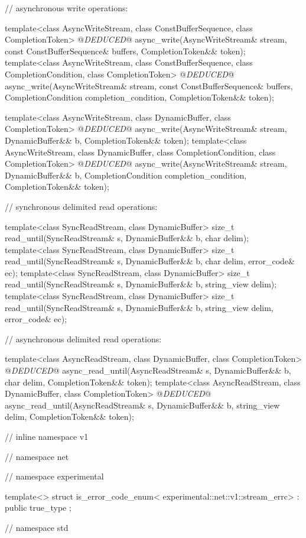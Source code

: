 \begin{codeblock}
{{{{  // asynchronous write operations:

  template<class AsyncWriteStream, class ConstBufferSequence,
    class CompletionToken>
      @\textit{DEDUCED}@ async_write(AsyncWriteStream& stream,
                       const ConstBufferSequence& buffers,
                       CompletionToken&& token);
  template<class AsyncWriteStream, class ConstBufferSequence,
    class CompletionCondition, class CompletionToken>
      @\textit{DEDUCED}@ async_write(AsyncWriteStream& stream,
                       const ConstBufferSequence& buffers,
                       CompletionCondition completion_condition,
                       CompletionToken&& token);

  template<class AsyncWriteStream, class DynamicBuffer, class CompletionToken>
    @\textit{DEDUCED}@ async_write(AsyncWriteStream& stream,
                     DynamicBuffer&& b, CompletionToken&& token);
  template<class AsyncWriteStream, class DynamicBuffer,
    class CompletionCondition, class CompletionToken>
      @\textit{DEDUCED}@ async_write(AsyncWriteStream& stream,
                       DynamicBuffer&& b,
                       CompletionCondition completion_condition,
                       CompletionToken&& token);

  // synchronous delimited read operations:

  template<class SyncReadStream, class DynamicBuffer>
    size_t read_until(SyncReadStream& s, DynamicBuffer&& b, char delim);
  template<class SyncReadStream, class DynamicBuffer>
    size_t read_until(SyncReadStream& s, DynamicBuffer&& b,
                      char delim, error_code& ec);
  template<class SyncReadStream, class DynamicBuffer>
    size_t read_until(SyncReadStream& s, DynamicBuffer&& b, string_view delim);
  template<class SyncReadStream, class DynamicBuffer>
    size_t read_until(SyncReadStream& s, DynamicBuffer&& b,
                      string_view delim, error_code& ec);

  // asynchronous delimited read operations:

  template<class AsyncReadStream, class DynamicBuffer, class CompletionToken>
    @\textit{DEDUCED}@ async_read_until(AsyncReadStream& s,
                          DynamicBuffer&& b, char delim,
                          CompletionToken&& token);
  template<class AsyncReadStream, class DynamicBuffer, class CompletionToken>
    @\textit{DEDUCED}@ async_read_until(AsyncReadStream& s,
                          DynamicBuffer&& b, string_view delim,
                          CompletionToken&& token);

} // inline namespace v1
} // namespace net
} // namespace experimental

  template<> struct is_error_code_enum<
    experimental::net::v1::stream_errc>
      : public true_type {};

} // namespace std
\end{codeblock}



